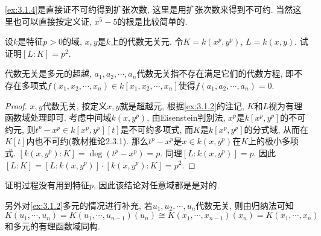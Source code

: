 \begin{remark}
    \ref{ex:3.1.4}是直接证不可约得到扩张次数, 这里是用扩张次数来得到不可约. 当然这里也可以直接按定义证, $x^5 - 5$的根是比较简单的.
\end{remark}

\begin{problem}\label{ex:3.1.15}
    设$k$是特征$p > 0$的域, $x, y$是$k$上的代数无关元. 令$K = k(x^{p}, y^{p})$, $L = k(x, y)$. 试证明$[L:K] = p^{2}$.
\end{problem}

\begin{remark}
    代数无关是多元的超越, $a_1, a_2, \cdots, a_n$代数无关指不存在满足它们的代数方程, 即不存在多项式$f(x_1, x_2, \cdots, x_n) \in k[x_1, x_2, \cdots, x_n]$使得$f(a_1, a_2, \cdots, a_n) = 0$.
\end{remark}

\begin{proof}
    $x, y$代数无关, 按定义$x, y$就是超越元, 根据\ref{ex:3.1.2}的注记, $K$和$L$视为有理函数域处理即可. 考虑中间域$k(x, y^p)$, 由Eisenstein判别法, $x^p$是$k[x^p, y^p]$的不可约元, 则$t^p - x^p \in k[x^p, y^p][t]$是不可约多项式, 而$K$是$k[x^p, y^p]$的分式域, 从而在$K[t]$内也不可约(教材推论2.3.1). 那么$t^p - x^p$是$x \in k(x, y^p)$在$K$上的极小多项式. $[k(x, y^p):K] = \deg(t^p - x^p) = p$. 同理$[L:k(x, y^p)] = p$. 因此$[L:K] = [L:k(x, y^p)] \cdot [k(x, y^p):K] = p^2$.
\end{proof}

\begin{remark}
    证明过程没有用到特征$p$, 因此该结论对任意域都是是对的.

    另外对\ref{ex:3.1.2}多元的情况进行补充, 若$u_1, u_2, \cdots, u_n$代数无关, 则由归纳法可知
    \[
        K(u_1, \cdots, u_n) = K(u_1, \cdots, u_{n - 1})(u_n) \cong K(x_1, \cdots, x_{n - 1})(x_n) = K(x_1, \cdots, x_n)
    \]
    和多元的有理函数域同构.
\end{remark}